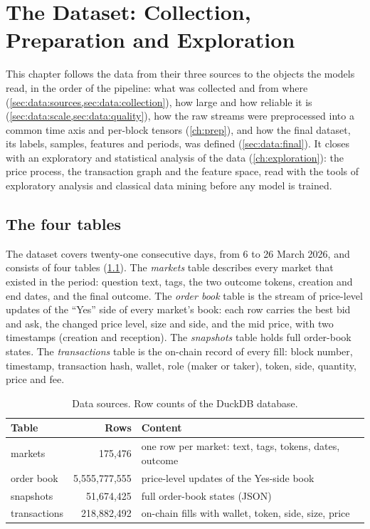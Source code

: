 \chapter[The Dataset]{The Dataset: Collection, Preparation and Exploration}
\label{ch:data}

This chapter follows the data from their three sources to the objects the models read, in
the order of the pipeline: what was collected and from where (\cref{sec:data:sources,sec:data:collection}),
how large and how reliable it is (\cref{sec:data:scale,sec:data:quality}), how the raw
streams were preprocessed into a common time axis and per-block tensors (\cref{ch:prep}),
and how the final dataset, its labels, samples, features and periods, was defined
(\cref{sec:data:final}).  It closes with an exploratory and statistical analysis of the
data (\cref{ch:exploration}): the price process, the transaction graph and the feature
space, read with the tools of exploratory analysis and classical data mining before any
model is trained.

\section{The four tables}
\label{sec:data:sources}

The dataset covers twenty-one consecutive days, from 6 to 26 March 2026, and consists of
four tables (\cref{tab:data:sources}).  The \emph{markets} table describes every market
that existed in the period: question text, tags, the two outcome tokens, creation and
end dates, and the final outcome.  The \emph{order book} table is the stream of
price-level updates of the ``Yes'' side of every market's book: each row carries the
best bid and ask, the changed price level, size and side, and the mid price, with two
timestamps (creation and reception).  The \emph{snapshots} table holds full order-book
states.  The \emph{transactions} table is the on-chain record of every fill: block
number, timestamp, transaction hash, wallet, role (maker or taker), token, side, quantity,
price and fee.

\begin{table}[t]
\centering
\caption{Data sources.  Row counts of the DuckDB database.}
\label{tab:data:sources}
\begin{tabular}{lrl}
\toprule
Table & Rows & Content \\
\midrule
markets      & 175{,}476            & one row per market: text, tags, tokens, dates, outcome \\
order book   & 5{,}555{,}777{,}555  & price-level updates of the Yes-side book \\
snapshots    & 51{,}674{,}425       & full order-book states (JSON) \\
transactions & 218{,}882{,}492      & on-chain fills with wallet, token, side, size, price \\
\bottomrule
\end{tabular}
\end{table}

